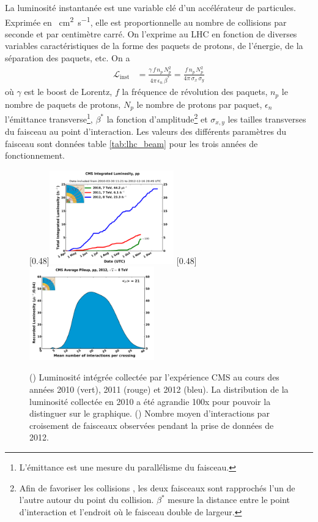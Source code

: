 La luminosité instantanée est une variable clé d'un accélérateur de particules. Exprimée en \si{\per\square\cm\per\second}, elle est proportionnelle au nombre de collisions par seconde et par centimètre carré. On l'exprime au LHC en fonction de diverses variables caractéristiques de la forme des paquets de protons,
de l'énergie, de la séparation des paquets, etc. On a
\begin{align*}
  \mathcal{L}_{\text{inst}} &= \frac{\gamma\,f\,n_p\,N_p^2}{4\pi\,\epsilon_n\,\beta^*} = \frac{f\,n_p\,N_p^2}{4\pi\,\sigma_x\,\sigma_y}
\end{align*}
où $\gamma$ est le boost de Lorentz, $f$ la fréquence de révolution des paquets, $n_p$ le nombre de paquets de protons, $N_p$ le nombre de protons par paquet, $\epsilon_n$ l'émittance transverse\footnote{L'émittance est une mesure du parallélisme du faisceau.}, $\beta^*$ la fonction d'amplitude\footnote{Afin de favoriser les collisions \Pproton{}\Pproton{}, les deux faisceaux sont rapprochés l'un de l'autre autour du point du collision. $\beta^*$ mesure la distance entre le point d'interaction et l'endroit où le faisceau double de largeur.} et $\sigma_{x,y}$ les tailles transverses du faisceau au point d'interaction. Les valeurs des différents paramètres du faisceau sont données table \ref{tab:lhc_beam} pour les trois années de fonctionnement.

\begin{figure} \centering
  \subcaptionbox{\label{fig:cms_lumi}}[0.48\textwidth]{\includegraphics[width=0.48\textwidth]{chapitre2/figs/CMS_lumi.pdf}}
  \subcaptionbox{\label{fig:cms_pu}}[0.48\textwidth]{\includegraphics[width=0.48\textwidth]{chapitre2/figs/pileup_pp_2012.pdf}}
  \caption{() Luminosité intégrée collectée par l'expérience CMS au cours des années 2010 (vert), 2011 (rouge) et 2012 (bleu). La distribution de la luminosité collectée en 2010 a été agrandie 100x pour pouvoir la distinguer sur le graphique. () Nombre moyen d'interactions par croisement de faisceaux observées pendant la prise de données de 2012.}
  \label{fig:lumi}
\end{figure}

